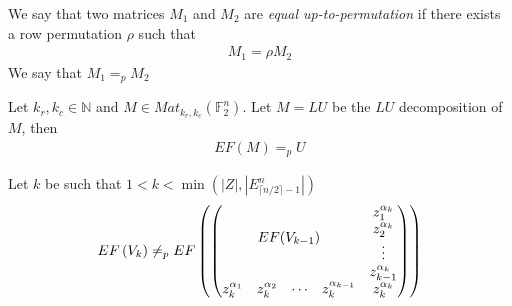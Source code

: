 \documentclass[11pt]{llncs}
\begin{document}
\begin{definition}
    We say that two matrices $M_1$ and $M_2$ are \textit{equal up-to-permutation} if there exists a row permutation $\rho$ such that
    \begin{align*}
        M_1 = \rho M_2
    \end{align*}
    We say that $M_1 =_p M_2$
\end{definition}

\begin{remark}\label{rem:rowEchelonForm}
    Let $k_r, k_c \in \mathbb{N}$ and $M\in Mat_{k_r,k_c}(\mathbb{F}_2^n)$. Let $M = LU$ be the $LU$ decomposition of $M$, then
    \begin{align*}
        EF(M) =_p U
    \end{align*}
\end{remark}

\begin{remark}
    Let $k$ be such that $1<k< \min{\left(|Z|,|E_{\lceil{n/2}\rceil-1}^n|\right)}$
    \begin{align*}
        EF\left(V_{k}\right) \neq_p EF\left(  \begin{pmatrix}
            \multicolumn{4}{c}{\multirow{4}{*}{$EF(V_{k-1})$}} & z_1^{\alpha_k}\\
            & & & & z_2^{\alpha_k}\\
            & & & & \vdots\\
            & & & & z_{k-1}^{\alpha_{k}}\\
            z_k^{\alpha_{1}} & z_k^{\alpha_{2}}& \cdots & z_{k}^{\alpha_{k-1}} & z_{k}^{\alpha_k}
        \end{pmatrix}\right)
    \end{align*}
\end{remark}
\end{document}
